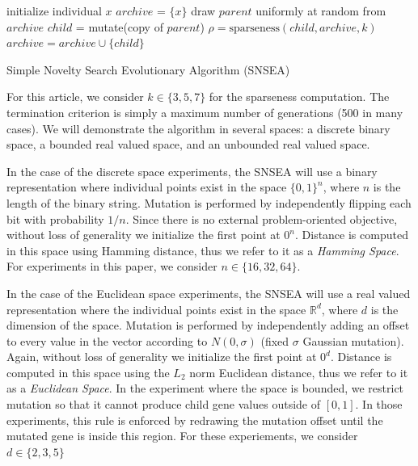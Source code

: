 \documentclass[twoside]{article}
\newcommand{\IR}{\mathbb{R}}
\begin{document}
\begin{algorithm}[h]
  \SetAlgoLined
  \DontPrintSemicolon 
  
  \;
    
  initialize individual $x$\;
  $archive$ = $\{x\}$\;
   {
    draw $parent$ uniformly at random from $archive$\;
    $child$ = mutate(copy of $parent$)\;
    $\rho = \mbox{sparseness}(child, archive, k)$\;
     {
      $archive = archive \cup \{child\}$\;
     }
  }
  \caption{Simple Novelty Search Evolutionary Algorithm (SNSEA)}
\end{algorithm}

For this article, we consider $k\in\{3,5,7\}$ for the sparseness computation.  The termination criterion is simply a maximum number of generations (500 in many cases).  We will demonstrate the algorithm in several spaces: a discrete binary space, a bounded real valued space, and an unbounded real valued space.  

In the case of the discrete space experiments, the SNSEA will use a binary representation where individual points exist in the space $\{0,1\}^n$, where $n$ is the length of the binary string.  Mutation is performed by independently flipping each bit with probability $1/n$.  Since there is no external problem-oriented objective, without loss of generality we initialize the first point at $0^n$.  Distance is computed in this space using Hamming distance, thus we refer to it as a \emph{Hamming Space}.  For experiments in this paper, we consider $n\in\{16, 32, 64\}$.

In the case of the Euclidean space experiments, the SNSEA will use a real valued representation where the individual points exist in the space $\IR^d$, where $d$ is the dimension of the space.  Mutation is performed by independently adding an offset to every value in the vector according to $N(0,\sigma)$ (fixed $\sigma$ Gaussian mutation).  Again, without loss of generality we initialize the first point at $0^d$.  Distance is computed in this space using the $L_2$ norm Euclidean distance, thus we refer to it as a \emph{Euclidean Space}.  In the experiment where the space is bounded, we restrict mutation so that it cannot produce child gene values outside of $[0,1]$.  In those experiments, this rule is enforced by redrawing the mutation offset until the mutated gene is inside this region.  For these experiements, we consider $d\in\{2, 3, 5\}$
\end{document}
